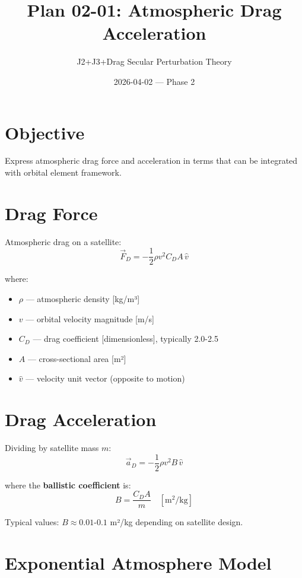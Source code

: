 \documentclass[11pt]{article}
\title{Plan 02-01: Atmospheric Drag Acceleration}
\author{J2+J3+Drag Secular Perturbation Theory}
\date{2026-04-02 — Phase 2}
\begin{document}
\maketitle

\section{Objective}
Express atmospheric drag force and acceleration in terms that can be integrated with orbital element framework.

\section{Drag Force}

Atmospheric drag on a satellite:
\begin{equation}
\vec{F}_D = -\frac{1}{2}\rho v^2 C_D A \,\hat{v}
\end{equation}

where:
\begin{itemize}
    \item $\rho$ — atmospheric density [kg/m³]
    \item $v$ — orbital velocity magnitude [m/s]
    \item $C_D$ — drag coefficient [dimensionless], typically 2.0-2.5
    \item $A$ — cross-sectional area [m²]
    \item $\hat{v}$ — velocity unit vector (opposite to motion)
\end{itemize}

\section{Drag Acceleration}

Dividing by satellite mass $m$:
\begin{equation}
\boxed{\vec{a}_D = -\frac{1}{2}\rho v^2 B\,\hat{v}}
\label{eq:drag_accel}
\end{equation}

where the \textbf{ballistic coefficient} is:
\begin{equation}
B = \frac{C_D A}{m} \quad [\text{m}^2/\text{kg}]
\end{equation}

Typical values: $B \approx 0.01$-$0.1$ m²/kg depending on satellite design.

\section{Exponential Atmosphere Model}
\end{document}
